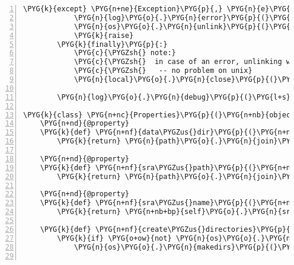 \begin{Verbatim}[commandchars=\\\{\},numbers=left,firstnumber=1,stepnumber=5]
        \PYG{k}{except} \PYG{n+ne}{Exception}\PYG{p}{,} \PYG{n}{e}\PYG{p}{:}
            \PYG{n}{log}\PYG{o}{.}\PYG{n}{error}\PYG{p}{(}\PYG{l+s}{"}\PYG{l+s}{Error downloading SRR: }\PYG{l+s+si}{\PYGZpc{}r}\PYG{l+s}{"} \PYG{o}{\PYGZpc{}} \PYG{n}{e}\PYG{p}{)}
            \PYG{n}{os}\PYG{o}{.}\PYG{n}{unlink}\PYG{p}{(}\PYG{n+nb+bp}{self}\PYG{o}{.}\PYG{n}{sra\PYGZus{}path}\PYG{p}{)}
            \PYG{k}{raise}
        \PYG{k}{finally}\PYG{p}{:}
            \PYG{c}{\PYGZsh{} note:}
            \PYG{c}{\PYGZsh{}  in case of an error, unlinking wil precede closing}
            \PYG{c}{\PYGZsh{}   -- no problem on unix}
            \PYG{n}{local}\PYG{o}{.}\PYG{n}{close}\PYG{p}{(}\PYG{p}{)}

        \PYG{n}{log}\PYG{o}{.}\PYG{n}{debug}\PYG{p}{(}\PYG{l+s}{"}\PYG{l+s}{Success!}\PYG{l+s}{"}\PYG{p}{)}

\PYG{k}{class} \PYG{n+nc}{Properties}\PYG{p}{(}\PYG{n+nb}{object}\PYG{p}{)}\PYG{p}{:}
    \PYG{n+nd}{@property}
    \PYG{k}{def} \PYG{n+nf}{data\PYGZus{}dir}\PYG{p}{(}\PYG{n+nb+bp}{self}\PYG{p}{)}\PYG{p}{:}
        \PYG{k}{return} \PYG{n}{path}\PYG{o}{.}\PYG{n}{join}\PYG{p}{(}\PYG{n}{rnaseqlyze}\PYG{o}{.}\PYG{n}{shared\PYGZus{}data\PYGZus{}path}\PYG{p}{,} \PYG{n+nb+bp}{self}\PYG{o}{.}\PYG{n}{srr}\PYG{p}{)}

    \PYG{n+nd}{@property}
    \PYG{k}{def} \PYG{n+nf}{sra\PYGZus{}path}\PYG{p}{(}\PYG{n+nb+bp}{self}\PYG{p}{)}\PYG{p}{:}
        \PYG{k}{return} \PYG{n}{path}\PYG{o}{.}\PYG{n}{join}\PYG{p}{(}\PYG{n+nb+bp}{self}\PYG{o}{.}\PYG{n}{data\PYGZus{}dir}\PYG{p}{,} \PYG{n+nb+bp}{self}\PYG{o}{.}\PYG{n}{sra\PYGZus{}name}\PYG{p}{)}

    \PYG{n+nd}{@property}
    \PYG{k}{def} \PYG{n+nf}{sra\PYGZus{}name}\PYG{p}{(}\PYG{n+nb+bp}{self}\PYG{p}{)}\PYG{p}{:}
        \PYG{k}{return} \PYG{n+nb+bp}{self}\PYG{o}{.}\PYG{n}{srr} \PYG{o}{+} \PYG{l+s}{"}\PYG{l+s}{.sra}\PYG{l+s}{"}

    \PYG{k}{def} \PYG{n+nf}{create\PYGZus{}directories}\PYG{p}{(}\PYG{n+nb+bp}{self}\PYG{p}{)}\PYG{p}{:}
        \PYG{k}{if} \PYG{o+ow}{not} \PYG{n}{os}\PYG{o}{.}\PYG{n}{path}\PYG{o}{.}\PYG{n}{isdir}\PYG{p}{(}\PYG{n+nb+bp}{self}\PYG{o}{.}\PYG{n}{data\PYGZus{}dir}\PYG{p}{)}\PYG{p}{:}
            \PYG{n}{os}\PYG{o}{.}\PYG{n}{makedirs}\PYG{p}{(}\PYG{n+nb+bp}{self}\PYG{o}{.}\PYG{n}{data\PYGZus{}dir}\PYG{p}{)}


\end{Verbatim}

